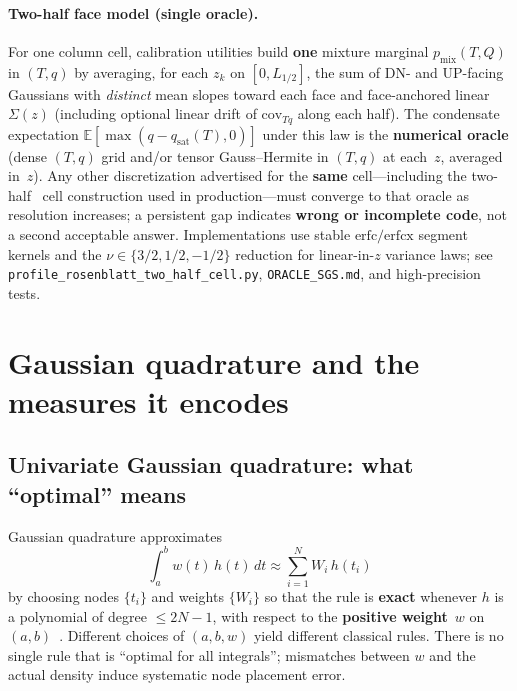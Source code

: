 \documentclass[11pt,a4paper]{article}
\begin{document}
\paragraph{Two-half face model (single oracle).}
For one column cell, calibration utilities build \textbf{one} mixture marginal $p_{\mathrm{mix}}(T,Q)$ in $(T,q)$ by averaging, for each $z_k$ on $[0,L_{\!1/2}]$, the sum of DN- and UP-facing Gaussians with \emph{distinct} mean slopes toward each face and face-anchored linear $\Sigma(z)$ (including optional linear drift of $\mathrm{cov}_{Tq}$ along each half). The condensate expectation $\mathbb{E}[\max(q-q_{\mathrm{sat}}(T),0)]$ under this law is the \textbf{numerical oracle} (dense $(T,q)$ grid and/or tensor Gauss--Hermite in $(T,q)$ at each~$z$, averaged in~$z$). Any other discretization advertised for the \textbf{same} cell---including the two-half \profileros\ cell construction used in production---must converge to that oracle as resolution increases; a persistent gap indicates \textbf{wrong or incomplete code}, not a second acceptable answer. Implementations use stable $\mathrm{erfc}/\mathrm{erfcx}$ segment kernels and the $\nu\in\{3/2,1/2,-1/2\}$ reduction for linear-in-$z$ variance laws; see \texttt{profile\_rosenblatt\_two\_half\_cell.py}, \texttt{ORACLE\_SGS.md}, and high-precision tests.

\section{Gaussian quadrature and the measures it encodes}
\label{sec:quad-background}

\subsection{Univariate Gaussian quadrature: what ``optimal'' means}
Gaussian quadrature approximates
\[
  \int_a^b w(t)\,h(t)\,dt \approx \sum_{i=1}^N W_i\,h(t_i)
\]
by choosing nodes $\{t_i\}$ and weights $\{W_i\}$ so that the rule is \textbf{exact} whenever $h$ is a polynomial of degree $\le 2N-1$, with respect to the \textbf{positive weight}~$w$ on $(a,b)$~\cite{golub,gautschi}.
Different choices of $(a,b,w)$ yield different classical rules.
There is no single rule that is ``optimal for all integrals''; mismatches between $w$ and the actual density induce systematic node placement error.
\end{document}

